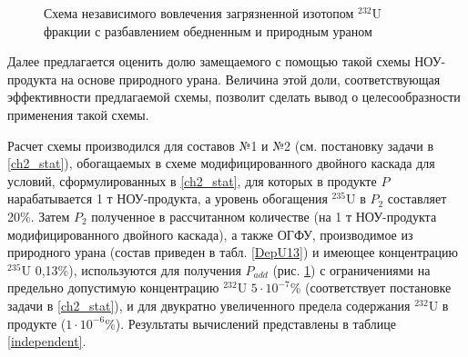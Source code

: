 \begin{figure}[ht]
  \caption{Схема независимого вовлечения загрязненной изотопом $^{232}$U фракции с разбавлением обедненным и природным ураном}\label{P2utilization}
\end{figure}

Далее предлагается оценить долю замещаемого с помощью такой схемы НОУ-продукта на основе природного урана. Величина этой доли, соответствующая эффективности предлагаемой схемы, позволит сделать вывод о целесообразности применения такой схемы.  

Расчет схемы производился для составов №1 и №2 (см. постановку задачи в \ref{ch2_stat}), обогащаемых в схеме модифицированного двойного каскада для условий, сформулированных в \ref{ch2_stat}, для которых в продукте $P$ нарабатывается 1 т НОУ-продукта, а уровень обогащения $^{235}$U в $P_2$ составляет 20\%. Затем $P_2$ полученное в рассчитанном количестве (на 1 т НОУ-продукта модифицированного двойного каскада), а также ОГФУ, производимое из природного урана (состав приведен в табл. \ref{DepU13}) и имеющее концентрацию $^{235}$U 0,13\%), используются для получения $P_{add}$ (рис. \ref{P2utilization}) с ограничениями на предельно допустимую концентрацию $^{232}$U $5\cdot10^{-7}$\% (соответствует постановке задачи в \ref{ch2_stat}), и для двукратно увеличенного предела содержания $^{232}$U в продукте ($1\cdot10^{-6}$\%). Результаты вычислений представлены в таблице \ref{independent}.

